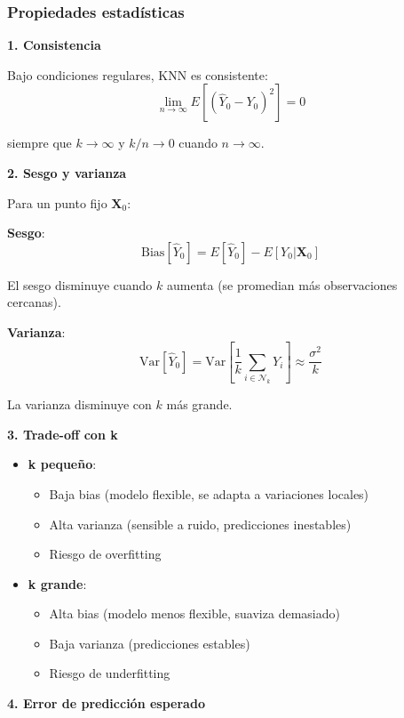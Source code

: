 \documentclass[
  doc,
  floatsintext,
  longtable,
  a4paper,
  nolmodern,
  notxfonts,
  notimes,
  12pt,
  colorlinks=true,linkcolor=blue,citecolor=blue,urlcolor=blue]{apa7}
\providecommand{\tightlist}{%
  \setlength{\itemsep}{0pt}\setlength{\parskip}{0pt}}
\begin{document}
\subsubsection{Propiedades
estadísticas}\label{propiedades-estaduxedsticas}

\textbf{1. Consistencia}

Bajo condiciones regulares, KNN es consistente: \[
\lim_{n \to \infty} E[(\hat{Y}_0 - Y_0)^2] = 0
\]

siempre que \(k \to \infty\) y \(k/n \to 0\) cuando \(n \to \infty\).

\textbf{2. Sesgo y varianza}

Para un punto fijo \(\mathbf{X}_0\):

\textbf{Sesgo}: \[
\text{Bias}[\hat{Y}_0] = E[\hat{Y}_0] - E[Y_0 | \mathbf{X}_0]
\]

El sesgo disminuye cuando \(k\) aumenta (se promedian más observaciones
cercanas).

\textbf{Varianza}: \[
\text{Var}[\hat{Y}_0] = \text{Var}\left[\frac{1}{k} \sum_{i \in \mathcal{N}_k} Y_i\right] \approx \frac{\sigma^2}{k}
\]

La varianza disminuye con \(k\) más grande.

\textbf{3. Trade-off con k}

\begin{itemize}
\item
  \textbf{k pequeño}:

  \begin{itemize}
  \tightlist
  \item
    Baja bias (modelo flexible, se adapta a variaciones locales)
  \item
    Alta varianza (sensible a ruido, predicciones inestables)
  \item
    Riesgo de overfitting
  \end{itemize}
\item
  \textbf{k grande}:

  \begin{itemize}
  \tightlist
  \item
    Alta bias (modelo menos flexible, suaviza demasiado)
  \item
    Baja varianza (predicciones estables)
  \item
    Riesgo de underfitting
  \end{itemize}
\end{itemize}

\textbf{4. Error de predicción esperado}
\end{document}
